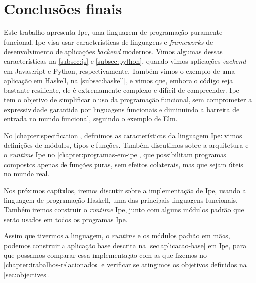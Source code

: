 
\chapter{Conclusões finais}

Este trabalho apresenta Ipe, uma linguagem de programação puramente funcional.
Ipe visa usar características de linguagens e \textit{frameworks} de desenvolvimento
de aplicações \textit{backend} modernos. Vimos algumas dessas características na
\autoref{subsec:js} e \autoref{subsec:python}, quando vimos aplicações \textit{backend}
em Javascript e Python, respectivamente. Também vimos o exemplo de uma aplicação
em Haskell, na \autoref{subsec:haskell}, e vimos que, embora o código seja bastante
resiliente, ele é extremamente complexo e difícil de compreender. Ipe tem o objetivo
de simplificar o uso da programação funcional, sem comprometer a expressividade
garantida por linguagens funcionais e diminuindo a barreira de entrada no mundo
funcional, seguindo o exemplo de Elm.

No \autoref{chapter:specification}, definimos as características da linguagem Ipe:
vimos definições de módulos, tipos e funções. Também discutimos sobre a arquitetura
e o \textit{runtime} Ipe no \autoref{chapter:programas-em-ipe}, que possibilitam
programas compostos apenas de funções puras, sem efeitos colaterais, mas que
sejam úteis no mundo real.

Nos próximos capítulos, iremos discutir sobre a implementação de Ipe, usando a
linguagem de programação Haskell, uma das principais linguagens funcionais. Também
iremos construir o \textit{runtime} Ipe, junto com alguns módulos padrão que serão
usados em todos os programas Ipe.

Assim que tivermos a linguagem, o \textit{runtime} e os módulos padrão em mãos,
podemos construir a aplicação base descrita na \autoref{sec:aplicacao-base} em Ipe,
para que possamos comparar essa implementação com as que fizemos no
\autoref{chapter:trabalhos-relacionados} e verificar se atingimos os objetivos
definidos na \autoref{sec:objectives}.
